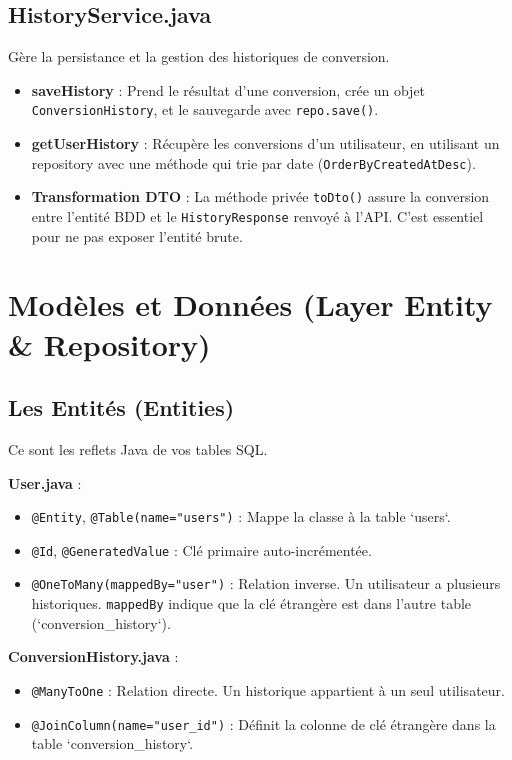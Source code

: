 \documentclass{article}
\begin{document}
\subsection{HistoryService.java}
Gère la persistance et la gestion des historiques de conversion.
\begin{itemize}
    \item \textbf{saveHistory} : Prend le résultat d'une conversion, crée un objet \texttt{ConversionHistory}, et le sauvegarde avec \texttt{repo.save()}.
    \item \textbf{getUserHistory} : Récupère les conversions d'un utilisateur, en utilisant un repository avec une méthode qui trie par date (\texttt{OrderByCreatedAtDesc}).
    \item \textbf{Transformation DTO} : La méthode privée \texttt{toDto()} assure la conversion entre l'entité BDD et le \texttt{HistoryResponse} renvoyé à l'API. C'est essentiel pour ne pas exposer l'entité brute.
\end{itemize}

\section{Modèles et Données (Layer Entity & Repository)}

\subsection{Les Entités (Entities)}
Ce sont les reflets Java de vos tables SQL.

\textbf{User.java} :
\begin{itemize}
    \item \texttt{@Entity}, \texttt{@Table(name="users")} : Mappe la classe à la table `users`.
    \item \texttt{@Id}, \texttt{@GeneratedValue} : Clé primaire auto-incrémentée.
    \item \texttt{@OneToMany(mappedBy="user")} : Relation inverse. Un utilisateur a plusieurs historiques. \texttt{mappedBy} indique que la clé étrangère est dans l'autre table (`conversion_history`).
\end{itemize}

\textbf{ConversionHistory.java} :
\begin{itemize}
    \item \texttt{@ManyToOne} : Relation directe. Un historique appartient à un seul utilisateur.
    \item \texttt{@JoinColumn(name="user\_id")} : Définit la colonne de clé étrangère dans la table `conversion\_history`.
\end{itemize}
\end{document}
